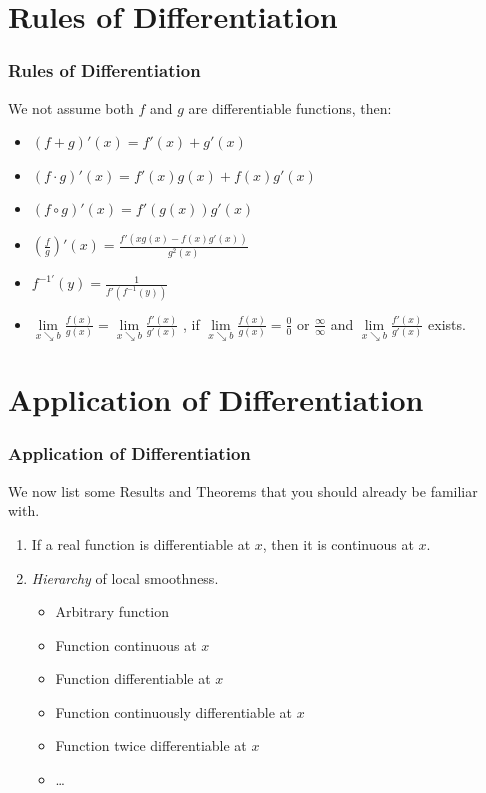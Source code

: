 \documentclass[12pt, t]{beamer}
\renewcommand{\emph}[1]{{\color{Turquoise3}\textsl{#1}}}
\begin{document}
\section{Rules of Differentiation}
\begin{frame}
    \frametitle{Rules of Differentiation}
We not assume both $f$ and $g$ are differentiable functions, then:
\begin{itemize}
    \item $(f+g)'(x)=f'(x)+g'(x)$
    \vspace{1em}
    \item $(f\cdot g)'(x)=f'(x)g(x)+f(x)g'(x)$
    \vspace{1em}
    \item $(f\circ g)'(x)=f'(g(x))g'(x)$
    \vspace{1em}
    \item $(\frac{f}{g})'(x)=\frac{f'(xg(x)-f(x)g'(x))}{g^2(x)}$
    \vspace{1em}
    \item $f^{-1'}(y)=\frac{1}{f'(f^{-1}(y))}$
    \vspace{1em}
    \item $\underset{x\searrow b}{\lim}\frac{f(x)}{g(x)}=\underset{x\searrow b}{\lim}\frac{f'(x)}{g'(x)}$
    , if $\underset{x\searrow b}{\lim}\frac{f(x)}{g(x)}=\frac{0}{0}\text{ or }\frac{\infty}{\infty}$ and $\underset{x\searrow b}{\lim}\frac{f'(x)}{g'(x)}$ exists.
\end{itemize}
\end{frame}

\section{Application of Differentiation}
\begin{frame}
    \frametitle{Application of Differentiation}
We now list some Results and Theorems that you should already be familiar with.\\
\vspace{1em}
\begin{enumerate}
    \item If a real function is differentiable at $x$, then it is continuous at $x$.
    \vspace{0.5em}
    \item \emph{Hierarchy} of local smoothness.
    \begin{itemize}
        \item Arbitrary function
        \item Function continuous at $x$
        \item Function differentiable at $x$
        \item Function continuously differentiable at $x$
        \item Function twice differentiable at $x$
        \item \dots
    \end{itemize}
\end{enumerate}


\end{frame}
\end{document}
